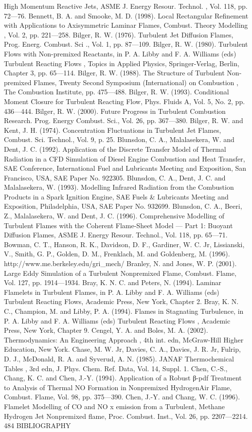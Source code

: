 \documentclass[11pt,a4paper,openany,fontset=none]{ctexbook}
\begin{document}
\begin{sloppypar}
{\small High Momentum Reactive Jets, ASME J. Energy Resour. Technol. , Vol. 118, pp. 72—76. Bennett, B. A. and Smooke, M. D. (1998). Local Rectangular Refinement with Applications to Axisymmetric Laminar Flames, Combust. Theory Modelling , Vol. 2, pp. 221—258. Bilger, R. W. (1976). Turbulent Jet Diffusion Flames, Prog. Energ. Combust. Sci ., Vol. 1, pp. 87—109. Bilger, R. W. (1980). Turbulent Flows with Non-premixed Reactants, in P. A. Libby and F. A. Williams (eds) Turbulent Reacting Flows , Topics in Applied Physics, Springer-Verlag, Berlin, Chapter 3, pp. 65—114. Bilger, R. W. (1988). The Structure of Turbulent Non-premixed Flames, Twenty Second Symposium (International) on Combustion , The Combustion Institute, pp. 475—488. Bilger, R. W. (1993). Conditional Moment Closure for Turbulent Reacting Flow, Phys. Fluids A, Vol. 5, No. 2, pp. 436—444. Bilger, R. W. (2000). Future Progress in Turbulent Combustion Research. Prog. Energy Combust. Sci., Vol. 26, pp. 367—380. Bilger, R. W. and Kent, J. H. (1974). Concentration Fluctuations in Turbulent Jet Flames, Combust. Sci. Technol., Vol. 9, p. 25. Blunsdon, C. A., Malalasekera, W. and Dent, J. C. (1992). Application of the Discrete Transfer Model of Thermal Radiation in a CFD Simulation of Diesel Engine Combustion and Heat Transfer, SAE Conference, International Fuel and Lubricants Meeting and Exposition, San Francisco, USA, SAE Paper No. 922305. Blunsdon, C. A., Dent, J. C. and Malalasekera, W. (1993). Modelling Infrared Radiation from the Combustion Products in a Spark Ignition Engine, SAE Fuels \& Lubricants Meeting and Exposition, Philadelphia, USA, SAE Paper No. 932699. Blunsdon, C. A., Beeri, Z., Malalasekera, W. and Dent, J. C. (1996). Comprehensive Modelling of Turbulent Flames with the Coherent Flame-Sheet Model — Part 1: Buoyant Diffusion Flames, ASME J. Energy Resour. Technol., Vol. 118, pp. 65—71. Bowman, C. T., Hanson, R. K., Davidson, D. F., Gardiner, W. C. Jr, Lissianski, V., Smith, G. P., Golden, D. M., Frenklach, M. and Goldenberg, M. (1996). http://www.me.berkeley.edu/gri\_mech/ Branley, N. and Jones, W. P. (2001). Large Eddy Simulation of a Turbulent Nonpremixed Flame, Combust. Flame, Vol. 127, pp. 1914—1934. Bray, K. N. C. and Peters, N. (1994). Laminar Flamelets in Turbulent Flames, in P. A. Libby and F. A. Williams (eds) Turbulent Reacting Flows, Academic Press, New York, Chapter 2. Bray, K. N. C., Champion, M. and Libby, P. A. (1994). Flames in Stagnating Turbulence, in P. A. Libby and F. A. Williams (eds) Turbulent Reacting Flows , Academic Press, New York, Chapter 9. Cengel, Y. A. and Boles, M. A. (2002). Thermodynamics: An Engineering Approach , 4th int. edn, McGraw-Hill Higher Education, New York. Chase, M. W. Jr, Davies, C. A., Davies, J. R. Jr, Fulrip, D. J., McDonald, R. A. and Syverud, A. N. (1985). JANAF Thermochemical Tables , 3rd edn, J. Phys. Chem. Ref. Data, Vol. 14, Suppl. 1. Chen, C.-S., Chang, K. C. and Chen, J.-Y. (1994). Application of a Robust β-pdf Treatment to Analysis of Thermal NO Formation in Nonpremixed HydrogenAir Flame, Combust. Flame, Vol. 98, pp. 375—390. Chen, J.-Y. and Chang, W. C. (1996). Flamelet Modelling of CO and NO x emission from a Turbulent, Methane Hydrogen Jet Nonpremixed flame, Proc. Combust. Inst., Vol. 26, pp. 2207—2214. 484 BIBLIOGRAPHY}\par

\end{sloppypar}
\end{document}
